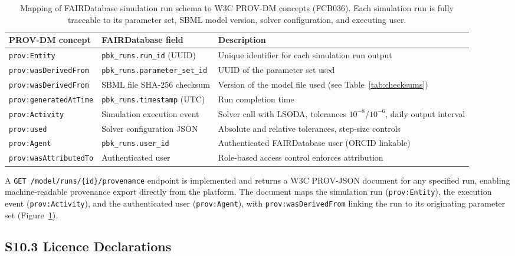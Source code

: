 \documentclass[12pt]{article}
\begin{document}
\begin{table}[h]
\centering
\caption{Mapping of FAIRDatabase simulation run schema to W3C PROV-DM concepts (FCB036). Each simulation run is fully traceable to its parameter set, SBML model version, solver configuration, and executing user.}
\label{tab:prov_mapping}
\begin{tabular}{p{3cm} p{4cm} p{7cm}}
\toprule
\textbf{PROV-DM concept} & \textbf{FAIRDatabase field} & \textbf{Description} \\
\midrule
\texttt{prov:Entity} & \texttt{pbk\_runs.run\_id} (UUID) & Unique identifier for each simulation run output \\
\texttt{prov:wasDerivedFrom} & \texttt{pbk\_runs.parameter\_set\_id} & UUID of the parameter set used \\
\texttt{prov:wasDerivedFrom} & SBML file SHA-256 checksum & Version of the model file used (see Table~\ref{tab:checksums}) \\
\texttt{prov:generatedAtTime} & \texttt{pbk\_runs.timestamp} (UTC) & Run completion time \\
\texttt{prov:Activity} & Simulation execution event & Solver call with LSODA, tolerances $10^{-8}$/$10^{-6}$, daily output interval \\
\texttt{prov:used} & Solver configuration JSON & Absolute and relative tolerances, step-size controls \\
\texttt{prov:Agent} & \texttt{pbk\_runs.user\_id} & Authenticated FAIRDatabase user (ORCID linkable) \\
\texttt{prov:wasAttributedTo} & Authenticated user & Role-based access control enforces attribution \\
\bottomrule
\end{tabular}
\end{table}

A \texttt{GET /model/runs/\{id\}/provenance} endpoint is implemented and returns a W3C PROV-JSON document for any specified run, enabling machine-readable provenance export directly from the platform. The document maps the simulation run (\texttt{prov:Entity}), the execution event (\texttt{prov:Activity}), and the authenticated user (\texttt{prov:Agent}), with \texttt{prov:wasDerivedFrom} linking the run to its originating parameter set (Figure~\ref{tab:prov_mapping}).

\subsection*{S10.3 Licence Declarations}
\end{document}
